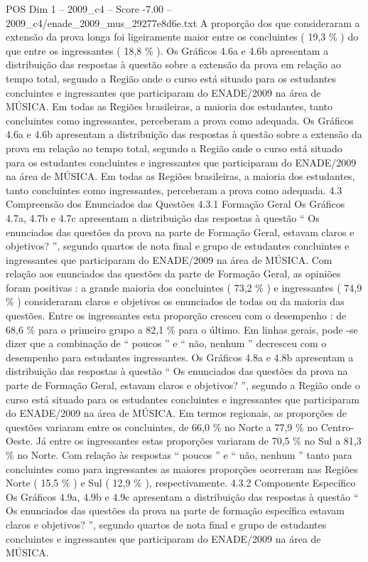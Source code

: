 \begin{textsample}{POS Dim 1 – 2009\_c4 – Score -7.00 – 2009\_c4/enade\_2009\_mus\_29277e8d6e.txt}
A proporção dos que consideraram a extensão da prova longa foi ligeiramente maior entre os concluintes ( 19,3 \% ) do que entre os ingressantes ( 18,8 \% ).
Os Gráficos 4.6a e 4.6b apresentam a distribuição das respostas à questão sobre a extensão da prova em relação ao tempo total, segundo a Região onde o curso está situado para os estudantes concluintes e ingressantes que participaram do ENADE/2009 na área de MÚSICA.
Em todas as Regiões brasileiras, a maioria dos estudantes, tanto concluintes como ingressantes, perceberam a prova como adequada.
Os Gráficos 4.6a e 4.6b apresentam a distribuição das respostas à questão sobre a extensão da prova em relação ao tempo total, segundo a Região onde o curso está situado para os estudantes concluintes e ingressantes que participaram do ENADE/2009 na área de MÚSICA.
Em todas as Regiões brasileiras, a maioria dos estudantes, tanto concluintes como ingressantes, perceberam a prova como adequada. 4.3 Compreensão dos Enunciados das Questões 4.3.1 Formação Geral Os Gráficos 4.7a, 4.7b e 4.7c apresentam a distribuição das respostas à questão “ Os enunciados das questões da prova na parte de Formação Geral, estavam claros e objetivos? ”, segundo quartos de nota final e grupo de estudantes concluintes e ingressantes que participaram do ENADE/2009 na área de MÚSICA.
Com relação aos enunciados das questões da parte de Formação Geral, as opiniões foram positivas : a grande maioria dos concluintes ( 73,2 \% ) e ingressantes ( 74,9 \% ) consideraram claros e objetivos os enunciados de todas ou da maioria das questões.
Entre os ingressantes esta proporção cresceu com o desempenho : de 68,6 \% para o primeiro grupo a 82,1 \% para o último.
Em linhas gerais, pode -se dizer que a combinação de “ poucos ” e “ não, nenhum ” decresceu com o desempenho para estudantes ingressantes.
Os Gráficos 4.8a e 4.8b apresentam a distribuição das respostas à questão “ Os enunciados das questões da prova na parte de Formação Geral, estavam claros e objetivos? ”, segundo a Região onde o curso está situado para os estudantes concluintes e ingressantes que participaram do ENADE/2009 na área de MÚSICA.
Em termos regionais, as proporções de questões variaram entre os concluintes, de 66,0 \% no Norte a 77,9 \% no Centro-Oeste.
Já entre os ingressantes estas proporções variaram de 70,5 \% no Sul a 81,3 \% no Norte.
Com relação às respostas “ poucos ” e “ não, nenhum ” tanto para concluintes como para ingressantes as maiores proporções ocorreram nas Regiões Norte ( 15,5 \% ) e Sul ( 12,9 \% ), respectivamente. 4.3.2 Componente Específico Os Gráficos 4.9a, 4.9b e 4.9c apresentam a distribuição das respostas à questão “ Os enunciados das questões da prova na parte de formação específica estavam claros e objetivos? ”, segundo quartos de nota final e grupo de estudantes concluintes e ingressantes que participaram do ENADE/2009 na área de MÚSICA.

\end{textsample}
